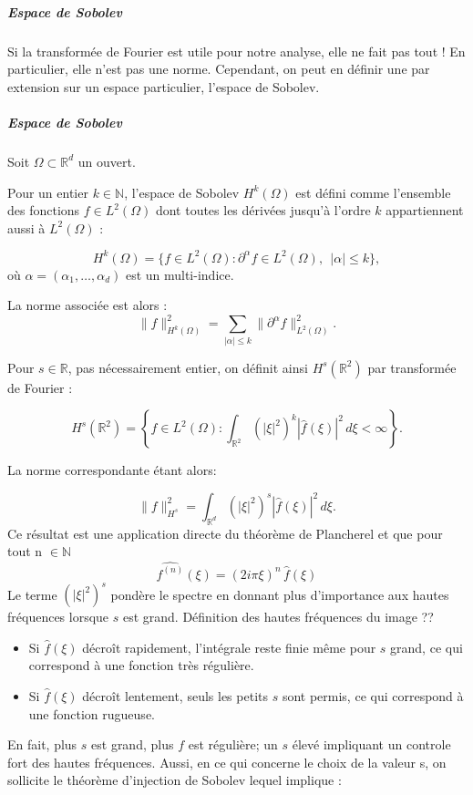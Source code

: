 \documentclass[12pt,a4paper]{article}
\begin{document}
\subparagraph{Espace de Sobolev}
Si la transformée de Fourier est utile pour notre analyse, elle ne fait pas tout ! En particulier, elle n'est pas une norme. Cependant, on peut en définir une par extension sur un espace particulier, l'espace de Sobolev. 
\subparagraph{Espace de Sobolev}
Soit $\Omega \subset \mathbb{R}^d$ un ouvert.

Pour un entier $k \in \mathbb{N}$, l’espace de Sobolev $H^k(\Omega)$ est défini comme l’ensemble des fonctions 
$f \in L^2(\Omega)$ dont toutes les dérivées jusqu’à l’ordre $k$ appartiennent aussi à $L^2(\Omega)$ :

\[
H^k(\Omega) = \bigl\{ f \in L^2(\Omega) : \partial^\alpha f \in L^2(\Omega),\ \ |\alpha| \leq k \bigr\},
\]
où $\alpha = (\alpha_1,\dots,\alpha_d)$ est un multi-indice.

La norme associée est alors :
\[
\|f\|_{H^k(\Omega)}^2 
= \sum_{|\alpha|\leq k} \|\partial^\alpha f\|_{L^2(\Omega)}^2.
\]

Pour $s \in \mathbb{R}$, pas nécessairement entier, on définit ainsi $H^s(\mathbb{R}^2)$ par transformée de Fourier :

\[
H^s(\mathbb{R}^2) = \left\{ f \in L^2(\Omega) : 
\int_{\mathbb{R}^2} (|\xi|^2)^k |\hat{f}(\xi)|^2 \, d\xi < \infty \right\}.
\] 

La norme correspondante étant alors:

\[
\|f\|_{H^s}^2 = \int_{\mathbb{R}^d} (|\xi|^2)^s |\hat{f}(\xi)|^2 \, d\xi.
\]
Ce résultat est une application directe du théorème de Plancherel et que pour tout n $\in \mathbb{N}$ \[
\widehat{f^{(n)}}(\xi) = (2 i \pi \xi)^n \, \hat{f}(\xi)
\]
 Le terme $(|\xi|^2)^s$ pondère le spectre en donnant plus d'importance 
aux hautes fréquences lorsque $s$ est grand. Définition des hautes fréquences du image ??  

\begin{itemize}
    \item Si $\hat{f}(\xi)$ décroît rapidement, l'intégrale reste finie même pour $s$ grand, 
    ce qui correspond à une fonction très régulière.
    \item Si $\hat{f}(\xi)$ décroît lentement, seuls les petits $s$ sont permis, 
    ce qui correspond à une fonction rugueuse.
\end{itemize}
En fait, plus $s$ est grand, plus $f$ est régulière; un $s$ élevé impliquant un controle fort des hautes fréquences. 
Aussi, en ce qui concerne le choix de la valeur s, on sollicite le théorème d’injection de Sobolev lequel implique : 
\end{document}
